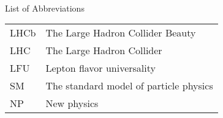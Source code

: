 \singlespacing \normalsize
\hbox{\ }

\vspace{.5in}

\begin{center}
\large{List of Abbreviations}
\end{center}

\vspace{3pt}

\begin{supertabular}{ll}
    LHCb  & The Large Hadron Collider Beauty \\
    LHC   & The Large Hadron Collider \\
    LFU   & Lepton flavor universality \\
    SM    & The standard model of particle physics \\
    NP    & New physics \\
\end{supertabular}
